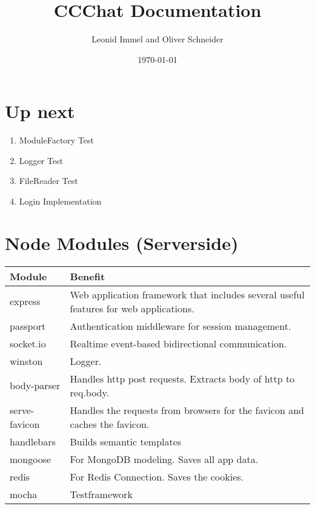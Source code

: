 \documentclass[10pt,a4paper,landscape]{article}
\title{CCChat Documentation}
\date{\today}
\author{Leonid Immel and Oliver Schneider}
\begin{document}
\maketitle
\tableofcontents

\section{Up next}
\begin{enumerate}
        \item
                ModuleFactory Test
        \item   
                Logger Test
        \item
                FileReader Test
        \item
                Login Implementation
\end{enumerate}

\section{Node Modules (Serverside)}
\begin{tabularx}{\textwidth}{ll}
    \textbf{Module} & \textbf{Benefit}               \\
    \toprule
    express         & Web application framework that includes several useful features for web applications. \\ 
    \midrule
    passport        & Authentication middleware for session management. \\
    \midrule
    socket.io       & Realtime event-based bidirectional communication. \\
    \midrule
    winston         & Logger. \\
    \midrule
    body-parser     & Handles http post requests. Extracts body of http to req.body. \\
    \midrule
    serve-favicon   & Handles the requests from browsers for the favicon and caches the favicon. \\
    \midrule
    handlebars      & Builds semantic templates \\
    \midrule
    mongoose        & For MongoDB modeling. Saves all app data. \\
    \midrule
    redis           & For Redis Connection. Saves the cookies. \\
    \midrule
    mocha           & Testframework \\
    \bottomrule
\end{tabularx}
\end{document}
